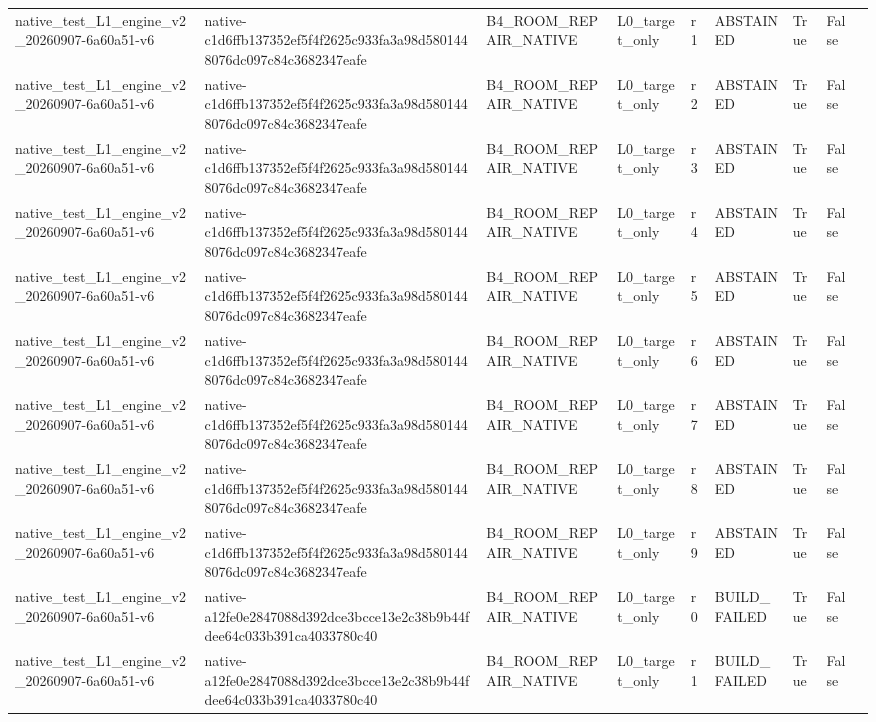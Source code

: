 \begin{tabular}{lllllllll}
native\_test\_L1\_engine\_v2\_20260907-6a60a51-v6 & native-c1d6ffb137352ef5f4f2625c933fa3a98d5801448076dc097c84c3682347eafe & B4\_ROOM\_REPAIR\_NATIVE & L0\_target\_only & r1 & ABSTAINED & True & False &  \\
native\_test\_L1\_engine\_v2\_20260907-6a60a51-v6 & native-c1d6ffb137352ef5f4f2625c933fa3a98d5801448076dc097c84c3682347eafe & B4\_ROOM\_REPAIR\_NATIVE & L0\_target\_only & r2 & ABSTAINED & True & False &  \\
native\_test\_L1\_engine\_v2\_20260907-6a60a51-v6 & native-c1d6ffb137352ef5f4f2625c933fa3a98d5801448076dc097c84c3682347eafe & B4\_ROOM\_REPAIR\_NATIVE & L0\_target\_only & r3 & ABSTAINED & True & False &  \\
native\_test\_L1\_engine\_v2\_20260907-6a60a51-v6 & native-c1d6ffb137352ef5f4f2625c933fa3a98d5801448076dc097c84c3682347eafe & B4\_ROOM\_REPAIR\_NATIVE & L0\_target\_only & r4 & ABSTAINED & True & False &  \\
native\_test\_L1\_engine\_v2\_20260907-6a60a51-v6 & native-c1d6ffb137352ef5f4f2625c933fa3a98d5801448076dc097c84c3682347eafe & B4\_ROOM\_REPAIR\_NATIVE & L0\_target\_only & r5 & ABSTAINED & True & False &  \\
native\_test\_L1\_engine\_v2\_20260907-6a60a51-v6 & native-c1d6ffb137352ef5f4f2625c933fa3a98d5801448076dc097c84c3682347eafe & B4\_ROOM\_REPAIR\_NATIVE & L0\_target\_only & r6 & ABSTAINED & True & False &  \\
native\_test\_L1\_engine\_v2\_20260907-6a60a51-v6 & native-c1d6ffb137352ef5f4f2625c933fa3a98d5801448076dc097c84c3682347eafe & B4\_ROOM\_REPAIR\_NATIVE & L0\_target\_only & r7 & ABSTAINED & True & False &  \\
native\_test\_L1\_engine\_v2\_20260907-6a60a51-v6 & native-c1d6ffb137352ef5f4f2625c933fa3a98d5801448076dc097c84c3682347eafe & B4\_ROOM\_REPAIR\_NATIVE & L0\_target\_only & r8 & ABSTAINED & True & False &  \\
native\_test\_L1\_engine\_v2\_20260907-6a60a51-v6 & native-c1d6ffb137352ef5f4f2625c933fa3a98d5801448076dc097c84c3682347eafe & B4\_ROOM\_REPAIR\_NATIVE & L0\_target\_only & r9 & ABSTAINED & True & False &  \\
native\_test\_L1\_engine\_v2\_20260907-6a60a51-v6 & native-a12fe0e2847088d392dce3bcce13e2c38b9b44fdee64c033b391ca4033780c40 & B4\_ROOM\_REPAIR\_NATIVE & L0\_target\_only & r0 & BUILD\_FAILED & True & False &  \\
native\_test\_L1\_engine\_v2\_20260907-6a60a51-v6 & native-a12fe0e2847088d392dce3bcce13e2c38b9b44fdee64c033b391ca4033780c40 & B4\_ROOM\_REPAIR\_NATIVE & L0\_target\_only & r1 & BUILD\_FAILED & True & False &  \\

\end{tabular}
